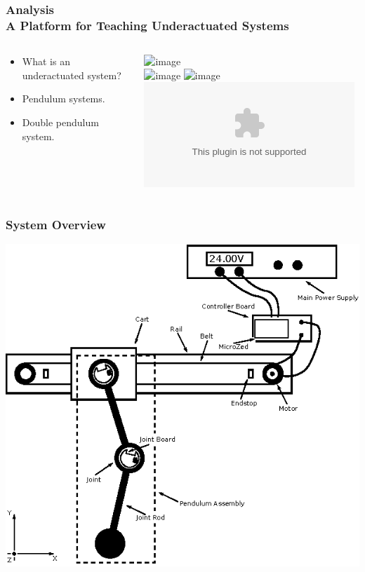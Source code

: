 \documentclass[mathserif]{beamer}
\begin{document}
\begin{frame}[c]\frametitle{Analysis\\ A Platform for Teaching Underactuated Systems}
	\begin{columns}
		\begin{column}[c]{.5\textwidth}
			\begin{itemize}[<+- | alert@+>]
				\item What is an underactuated system?
				\item Pendulum systems.
				\item Double pendulum system.
			\end{itemize}
		\end{column}
		\begin{column}[c]{.5\textwidth}
			\centering
			\includegraphics<1>[width=\linewidth]{graphics/robo_underactuated}\\
			\vspace{1cm}
			\includegraphics<1>[width=.50\linewidth]{graphics/robo_underactuated_picture}
			\includegraphics<2>[width=\linewidth]{graphics/segway}
			\includegraphics<3>[width=\linewidth]{graphics/joint_assembly.eps}
		\end{column}
	\end{columns}
\end{frame}

\begin{frame}[c]\frametitle{System Overview}
\centering
\includegraphics[scale=1]{graphics/system_overview}
\end{frame}
\end{document}
